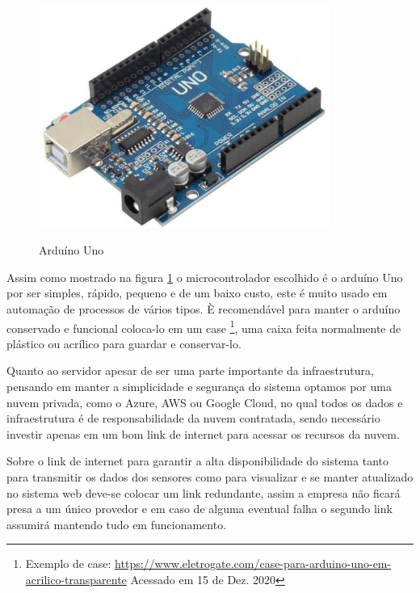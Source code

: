 \documentclass[hidelinks, 12pt, a4paper, brazil, oneside]{abntex2}
\begin{document}
    \begin{figure}[ht]
        \caption{Arduíno Uno}
        \centering
        \includegraphics[width=0.85\textwidth]{img/arduino_uno.jpg}
        \label{fig:arduinoUno}
    \end{figure}


    Assim como mostrado na figura \ref{fig:arduinoUno}
    o microcontrolador escolhido é o arduíno Uno
    por ser simples, rápido, pequeno e de um baixo custo,
    este é muito usado em automação de processos
    de vários tipos. È recomendável para manter o 
    arduíno conservado e funcional coloca-lo em um case
    \footnote{
        Exemplo de case: \url{https://www.eletrogate.com/case-para-arduino-uno-em-acrilico-transparente}
        Acessado em 15 de Dez. 2020
    },
    uma caixa feita normalmente de plástico ou acrílico 
    para guardar e conservar-lo.

    Quanto ao servidor apesar de ser uma parte importante 
    da infraestrutura, pensando em manter a simplicidade 
    e segurança do sistema optamos por uma nuvem privada,
    como o Azure, AWS ou Google Cloud, no qual todos os 
    dados e infraestrutura é de responsabilidade da 
    nuvem contratada, sendo necessário investir apenas 
    em um bom link de internet para acessar os recursos 
    da nuvem.

    Sobre o link de internet para garantir a 
    alta disponibilidade do sistema tanto 
    para transmitir os dados dos sensores 
    como para visualizar e se manter atualizado
    no sistema web deve-se colocar um link redundante,
    assim a empresa não ficará presa a um único provedor 
    e em caso de alguma eventual falha o segundo link 
    assumirá mantendo tudo em funcionamento.
\end{document}
